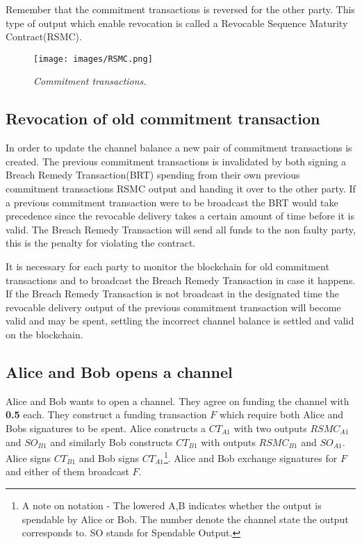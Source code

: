 Remember that the commitment transactions is reversed for the other party. This type of output which enable revocation is called a Revocable Sequence Maturity Contract(RSMC).

\begin{figure}[!htb]
			\hspace*{-0.8cm} 
	\centering
	\texttt{[image: images/RSMC.png]}
	\caption{\textit{Commitment transactions. 
	}}
	\label{fig:commitment:tx}
			\hspace*{2mm} 
\end{figure}

\subsection{Revocation of old commitment transaction}

In order to update the channel balance a new pair of commitment transactions is created. The previous commitment transactions is invalidated by both signing a Breach Remedy Transaction(BRT) spending from their own previous commitment transactions RSMC output and handing it over to the other party. If a previous commitment transaction were to be broadcast the BRT would take precedence since the revocable delivery takes a certain amount of time before it is valid. The Breach Remedy Transaction will send all funds to the non faulty party, this is the penalty for violating the contract.

It is necessary for each party to monitor the blockchain for old commitment transactions and to broadcast the Breach Remedy Transaction in case it happens. If the Breach Remedy Transaction is not broadcast in the designated time the revocable delivery output of the previous commitment transaction will become valid and may be spent, settling the incorrect channel balance is settled and valid on the blockchain.

\subsection{Alice and Bob opens a channel}

Alice and Bob wants to open a channel. They agree on funding the channel with \textbf{0.5\bitcoin} each. They construct a funding transaction $F$ which require both Alice and Bobs signatures to be spent. Alice constructs a $CT_{A1}$ with two outputs $RSMC_{A1}$ and $SO_{B1}$ and similarly Bob constructs $CT_{B1}$ with outputs $RSMC_{B1}$ and $SO_{A1}$. Alice signs $CT_{B1}$ and Bob signs $CT_{A1}$\footnote{A note on notation - The lowered A,B indicates whether the output is spendable by Alice or Bob. The number denote the channel state the output corresponds to. SO stands for Spendable Output.}. Alice and Bob exchange signatures for $F$ and either of them broadcast $F$.


